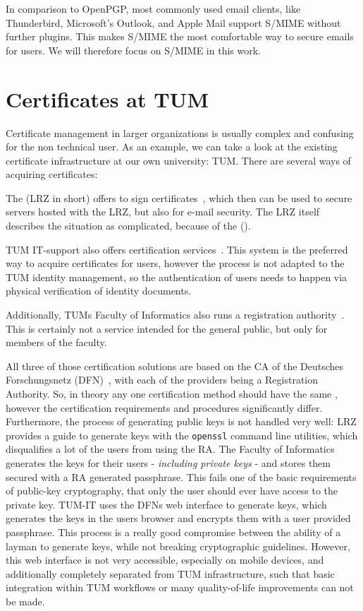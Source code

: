 In comparison to OpenPGP, most commonly used email clients, like Thunderbird, Microsoft's Outlook, and Apple Mail
support S/MIME without further plugins.
This makes S/MIME the most comfortable way to secure emails for users.
We will therefore focus on S/MIME in this work.

\section{Certificates at TUM}\label{sec:certificatesAtTum}
Certificate management in larger organizations is usually complex and confusing for the non technical user.
As an example, we can take a look at the existing certificate infrastructure at our own university: TUM\@.
There are several ways of acquiring certificates:

The  (LRZ in short) offers to sign
certificates~\cite{lrzpki}, which then can be used to secure servers hosted with the LRZ, but also for e-mail security.
The LRZ itself describes the situation as complicated, because of the 
().

TUM IT-support also offers certification services~\cite{tumZertifikat}.
This system is the preferred way to acquire certificates for users, however the process is not adapted to the TUM
identity management, so the authentication of users needs to happen via physical verification of identity documents.

Additionally, TUMs Faculty of Informatics also runs a registration authority~\cite{inTumCertificates}.
This is certainly not a service intended for the general public, but only for members of the faculty.

All three of those certification solutions are based on the CA of the Deutsches For\-schungs\-netz (DFN)~\cite{dfnPki},
with each of the providers being a Registration Authority.
So, in theory any one certification method should have the same , however the certification requirements and
procedures significantly differ.
Furthermore, the process of generating public keys is not handled very well: LRZ provides a guide to generate keys with
the \lstinline{openssl} command line utilities, which disqualifies a lot of the users from using the RA\@.
The Faculty of Informatics generates the keys for their users - \emph{including private keys} - and stores them secured
with a RA generated passphrase.
This fails one of the basic requirements of public-key cryptography, that only the user should ever have access to the
private key.
TUM-IT uses the DFNs web interface to generate keys, which generates the keys in the users browser and encrypts them
with a user provided passphrase.
This process is a really good compromise between the ability of a layman to generate keys, while not breaking
cryptographic guidelines.
However, this web interface is not very accessible, especially on mobile devices, and additionally completely separated
from TUM infrastructure, such that basic integration within TUM workflows or many quality-of-life improvements can not
be made.

